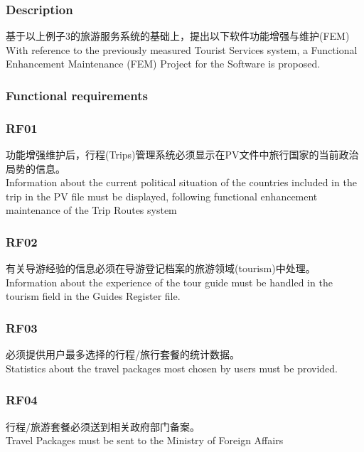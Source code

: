 \hypertarget{description-1}{%
\subsubsection{Description}\label{description-1}}

基于以上例子3的旅游服务系统的基础上，提出以下软件功能增强与维护(FEM)\\
With reference to the previously measured Tourist Services system, a
Functional Enhancement Maintenance (FEM) Project for the Software is
proposed.

\hypertarget{functional-requirements-1}{%
\subsubsection{Functional
requirements}\label{functional-requirements-1}}

\hypertarget{rf01-3}{%
\subsubsection{RF01}\label{rf01-3}}

功能增强维护后，行程(Trips)管理系统必须显示在PV文件中旅行国家的当前政治局势的信息。\\
Information about the current political situation of the countries
included in the trip in the PV file must be displayed, following
functional enhancement maintenance of the Trip Routes system

\hypertarget{rf02-3}{%
\subsubsection{RF02}\label{rf02-3}}

有关导游经验的信息必须在导游登记档案的旅游领域(tourism)中处理。\\
Information about the experience of the tour guide must be handled in
the tourism field in the Guides Register file.

\hypertarget{rf03-3}{%
\subsubsection{RF03}\label{rf03-3}}

必须提供用户最多选择的行程/旅行套餐的统计数据。\\
Statistics about the travel packages most chosen by users must be
provided.

\hypertarget{rf04-3}{%
\subsubsection{RF04}\label{rf04-3}}

行程/旅游套餐必须送到相关政府部门备案。\\
Travel Packages must be sent to the Ministry of Foreign Affairs



